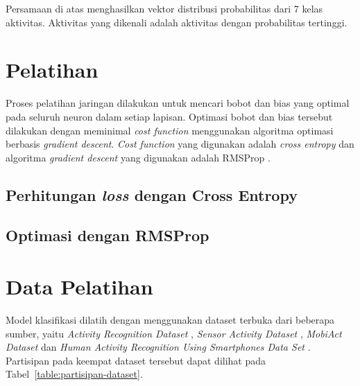 Persamaan di atas menghasilkan vektor distribusi probabilitas dari 7 kelas aktivitas. Aktivitas yang dikenali adalah aktivitas dengan probabilitas tertinggi.


\section{Pelatihan}
Proses pelatihan jaringan dilakukan untuk mencari bobot dan bias yang optimal pada seluruh neuron dalam setiap lapisan. Optimasi bobot dan bias tersebut dilakukan dengan meminimal \textit{cost function} menggunakan algoritma optimasi berbasis \textit{gradient descent}. \textit{Cost function} yang digunakan adalah \textit{cross entropy} dan algoritma \textit{gradient descent} yang digunakan adalah RMSProp \citep{Dauphin-2015}.

\subsection{Perhitungan \textit{loss} dengan Cross Entropy}


\subsection{Optimasi dengan RMSProp}

%
%
\section{Data Pelatihan}
Model klasifikasi dilatih dengan menggunakan dataset terbuka dari beberapa sumber, yaitu \textit{Activity Recognition Dataset} \citep{shoaib-2013}, \textit{Sensor Activity Dataset} \citep{shoaib-2014}, \textit{MobiAct Dataset} \citep{vavoulas-2016} dan \textit{Human Activity Recognition Using Smartphones Data Set} \citep{anguita-2013}. Partisipan pada keempat dataset tersebut dapat dilihat pada Tabel~\ref{table:partisipan-dataset}.

